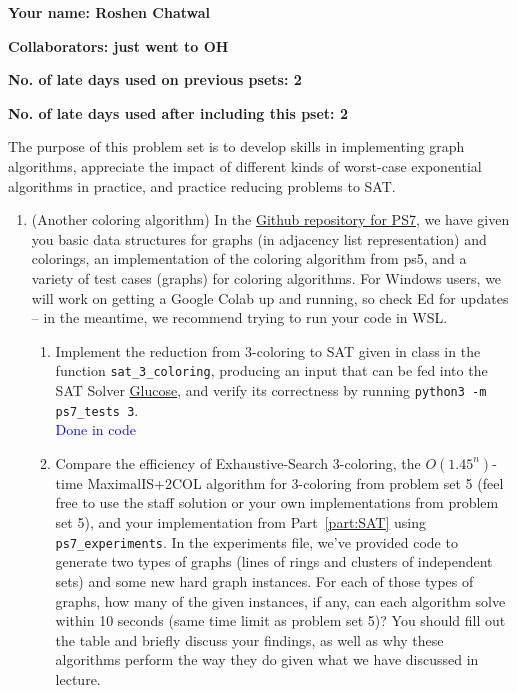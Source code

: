 \documentclass[11pt]{article}
\begin{document}

\textbf{Your name: Roshen Chatwal}

\textbf{Collaborators: just went to OH}

\textbf{No. of late days used on previous psets: 2}

\textbf{No. of late days used after including this pset: 2}


The purpose of this problem set is to develop skills in implementing graph algorithms, appreciate the impact of different kinds of worst-case exponential algorithms in practice, and practice reducing problems to SAT.
\begin{enumerate}

    \item (Another coloring algorithm) 
  In the \href{https://github.com/Harvard-CS-1200/cs1200/tree/main/fall2024/psets/ps7}{Github repository for PS7}, we have given you basic data structures for graphs (in adjacency list representation) and colorings, an implementation of the coloring algorithm from ps5, and a variety of test cases (graphs) for coloring algorithms. For Windows users, we will work on getting a Google Colab up and running, so check Ed for updates -- in the meantime, we recommend trying to run your code in WSL.
  
  \begin{enumerate}
      
      \item Implement the reduction from 3-coloring to SAT given in class in the function \texttt{sat\_3\_coloring}, producing an input that can be fed into the SAT Solver \href{https://pysathq.github.io/usage/}{Glucose}, and verify its correctness by running \texttt{python3 -m ps7\_tests 3}. \label{part:SAT} \\

      \textcolor{blue}{Done in code} \\

      \item Compare the efficiency of Exhaustive-Search 3-coloring, the $O(1.45^n)$-time MaximalIS+2COL algorithm for 3-coloring from problem set 5 (feel free to use the staff solution or your own implementations from problem set 5), and your implementation from  Part~\ref{part:SAT} using \texttt{ps7\_experiments}. In the experiments file, we've provided code to generate two types of graphs (lines of rings and clusters of independent sets) and some new hard graph instances. For each of those types of graphs, how many of the given instances, if any, can each algorithm solve within 10 seconds (same time limit as problem set 5)? You should fill out the table and briefly discuss your findings, as well as why these algorithms perform the way they do given what we have discussed in lecture.


\end{enumerate}
\end{enumerate}
\end{document}
